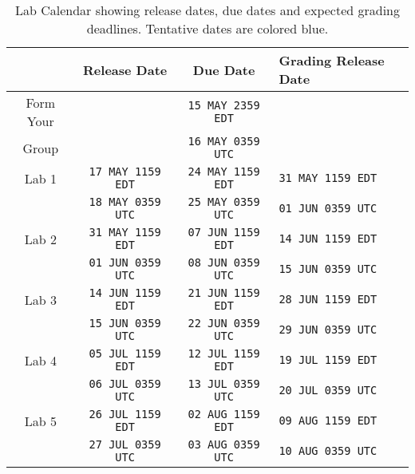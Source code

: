 %
\begin{table}
  \centering
  \begin{tabular}{c|c|c|l}
      & Release Date & Due Date & Grading Release Date\\ \hline
    Form Your
      &
      & \texttt{15 MAY 2359 EDT}
      & \\
    Group
      &
      & \texttt{16 MAY 0359 UTC}
      & \\ \hline
    Lab 1
      & \texttt{17 MAY 1159 EDT}
      & \texttt{24 MAY 1159 EDT}
      & {\color{blue}\texttt{31 MAY 1159 EDT}}\\
      & \texttt{18 MAY 0359 UTC}
      & \texttt{25 MAY 0359 UTC}
      & {\color{blue}\texttt{01 JUN 0359 UTC}}\\ \hline
    Lab 2
      & {\color{blue}\texttt{31 MAY 1159 EDT}}
      & {\color{blue}\texttt{07 JUN 1159 EDT}}
      & {\color{blue}\texttt{14 JUN 1159 EDT}}\\
      & {\color{blue}\texttt{01 JUN 0359 UTC}}
      & {\color{blue}\texttt{08 JUN 0359 UTC}}
      & {\color{blue}\texttt{15 JUN 0359 UTC}}\\ \hline
    Lab 3
      & {\color{blue}\texttt{14 JUN 1159 EDT}}
      & {\color{blue}\texttt{21 JUN 1159 EDT}}
      & {\color{blue}\texttt{28 JUN 1159 EDT}}\\
      & {\color{blue}\texttt{15 JUN 0359 UTC}}
      & {\color{blue}\texttt{22 JUN 0359 UTC}}
      & {\color{blue}\texttt{29 JUN 0359 UTC}}\\ \hline
    Lab 4
      & {\color{blue}\texttt{05 JUL 1159 EDT}}
      & {\color{blue}\texttt{12 JUL 1159 EDT}}
      & {\color{blue}\texttt{19 JUL 1159 EDT}}\\
      & {\color{blue}\texttt{06 JUL 0359 UTC}}
      & {\color{blue}\texttt{13 JUL 0359 UTC}}
      & {\color{blue}\texttt{20 JUL 0359 UTC}}\\ \hline
    Lab 5
      & {\color{blue}\texttt{26 JUL 1159 EDT}}
      & {\color{blue}\texttt{02 AUG 1159 EDT}}
      & {\color{blue}\texttt{09 AUG 1159 EDT}}\\
      & {\color{blue}\texttt{27 JUL 0359 UTC}}
      & {\color{blue}\texttt{03 AUG 0359 UTC}}
      & {\color{blue}\texttt{10 AUG 0359 UTC}}
  \end{tabular}
  \caption[Lab Calendar]{%
    Lab Calendar showing release dates, due dates and expected grading
    deadlines. Tentative dates are colored blue.
  }
  \label{tab:labcalendar}
\end{table}
